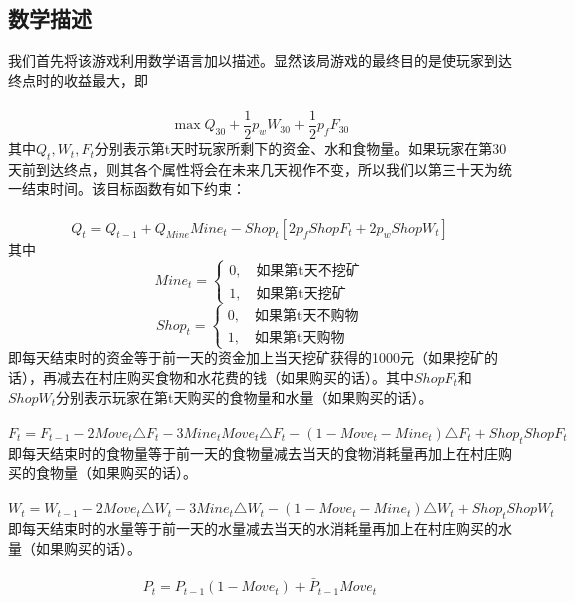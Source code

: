 \documentclass[withoutpre]{cumcmthesis} %
\begin{document}
\subsection{数学描述}

我们首先将该游戏利用数学语言加以描述。显然该局游戏的最终目的是使玩家到达终点时的收益最大，即\\\\
\begin{equation}
	\max Q_{30}+\frac{1}{2}p_wW_{30}+\frac{1}{2}p_fF_{30}
\end{equation}
其中$Q_{t},W_{t},F_{t}$分别表示第t天时玩家所剩下的资金、水和食物量。如果玩家在第30天前到达终点，则其各个属性将会在未来几天视作不变，所以我们以第三十天为统一结束时间。该目标函数有如下约束：\\\\
\begin{equation}
	Q_t=Q_{t-1}+Q_{Mine}Mine_t-Shop_t[2p_fShopF_t+2p_wShopW_t]
\end{equation}
其中$$Mine_t=\begin{cases}
0,\quad \text{如果第t天不挖矿}\\
1,\quad \text{如果第t天挖矿}
\end{cases}$$
$$Shop_t=\begin{cases}
0,\quad \text{如果第t天不购物}\\
1,\quad \text{如果第t天购物}
\end{cases}$$
即每天结束时的资金等于前一天的资金加上当天挖矿获得的1000元（如果挖矿的话），再减去在村庄购买食物和水花费的钱（如果购买的话）。其中$ShopF_t$和$ShopW_t$分别表示玩家在第t天购买的食物量和水量（如果购买的话）。\\\\
\begin{equation}
F_t=F_{t-1}-2Move_t\triangle F_t-3Mine_tMove_t\triangle F_t-(1-Move_t-Mine_t)\triangle F_t+Shop_tShopF_t
\end{equation}
即每天结束时的食物量等于前一天的食物量减去当天的食物消耗量再加上在村庄购买的食物量（如果购买的话）。\\\\
\begin{equation}
W_t=W_{t-1}-2Move_t\triangle W_t-3Mine_t\triangle W_t-(1-Move_t-Mine_t)\triangle W_t+Shop_tShopW_t
\end{equation}
即每天结束时的水量等于前一天的水量减去当天的水消耗量再加上在村庄购买的水量（如果购买的话）。\\\\
\begin{equation}
P_{t}=P_{t-1}(1-Move_t)+\bar{P}_{t-1}Move_t
\end{equation}
\end{document}
